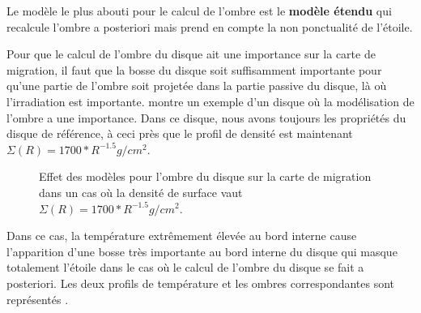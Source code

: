 Le modèle le plus abouti pour le calcul de l'ombre est le \textbf{modèle étendu} qui recalcule l'ombre a posteriori mais prend en compte la non ponctualité de l'étoile. 

Pour que le calcul de l'ombre du disque ait une importance sur la carte de migration, il faut que la bosse du disque soit suffisamment importante pour qu'une partie de l'ombre soit projetée dans la partie passive du disque, là où l'irradiation est importante.  montre un exemple d'un disque où la modélisation de l'ombre a une importance. Dans ce disque, nous avons toujours les propriétés du disque de référence, à ceci près que le profil de densité est maintenant $\Sigma(R) = 1700 * R^{-1.5}\unit{g/cm^2}$. 

\begin{figure}[htb]
\centering
{}\hfill
{}
\caption{Effet des modèles pour l'ombre du disque sur la carte de migration dans un cas où la densité de surface vaut $\Sigma(R) = 1700 * R^{-1.5}\unit{g/cm^2}$. }\label{fig:shadow-example}
\end{figure}

Dans ce cas, la température extrêmement élevée au bord interne cause l'apparition d'une bosse très importante au bord interne du disque qui masque totalement l'étoile dans le cas où le calcul de l'ombre du disque se fait a posteriori. Les deux profils de température et les ombres correspondantes sont représentés . 

